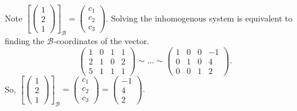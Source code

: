 \begin{enumerate}
		Note \(\left[\!\begin{pmatrix}1 \\ 2 \\1 \end{pmatrix}\!\right]_{\mathcal{B}} = \begin{pmatrix}c_1 \\ c_2 \\ c_3\end{pmatrix}\). Solving the inhomogenous system
		is equivalent to finding the \(\mathcal{B}\)-coordinates of the vector.
		\[\left(\!\!\begin{array}{ccc|c}1 & 0 & 1 & 1\\ 2 & 1 & 0 & 2\\ 5 & 1 & 1 & 1\end{array}\!\!\right) \sim \dots \sim \left(\!\!\begin{array}{ccc|c}1 & 0 & 0 & -1\\ 0 & 1 & 0 & 4\\ 0 & 0 & 1 & 2\end{array}\!\!\right).\]
		So, 
		\(\left[\!\begin{pmatrix}1 \\ 2 \\1 \end{pmatrix}\!\right]_{\mathcal{B}} = \begin{pmatrix}c_1 \\ c_2 \\ c_3\end{pmatrix} = \begin{pmatrix}-1 \\ 4 \\ 2\end{pmatrix}.\)
\end{enumerate}